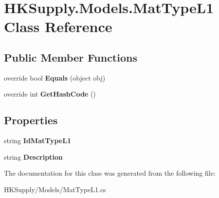 \hypertarget{class_h_k_supply_1_1_models_1_1_mat_type_l1}{}\section{H\+K\+Supply.\+Models.\+Mat\+Type\+L1 Class Reference}
\label{class_h_k_supply_1_1_models_1_1_mat_type_l1}
\subsection*{Public Member Functions}
\begin{DoxyCompactItemize}
\item 
\mbox{\label{class_h_k_supply_1_1_models_1_1_mat_type_l1_a3eb3b404fd126366080f9cafcfed397d}} 
override bool {\bfseries Equals} (object obj)
\item 
\mbox{\label{class_h_k_supply_1_1_models_1_1_mat_type_l1_a15e69846adbedd8a5b96f8900bde7e4a}} 
override int {\bfseries Get\+Hash\+Code} ()
\end{DoxyCompactItemize}
\subsection*{Properties}
\begin{DoxyCompactItemize}
\item 
\mbox{\label{class_h_k_supply_1_1_models_1_1_mat_type_l1_a64db0f8d7e4b0340df49dde2318a502d}} 
string {\bfseries Id\+Mat\+Type\+L1}
\item 
\mbox{\label{class_h_k_supply_1_1_models_1_1_mat_type_l1_aada8220899249bf0985036a5a090e86b}} 
string {\bfseries Description}
\end{DoxyCompactItemize}


The documentation for this class was generated from the following file\+:\begin{DoxyCompactItemize}
\item 
H\+K\+Supply/\+Models/Mat\+Type\+L1.\+cs\end{DoxyCompactItemize}
